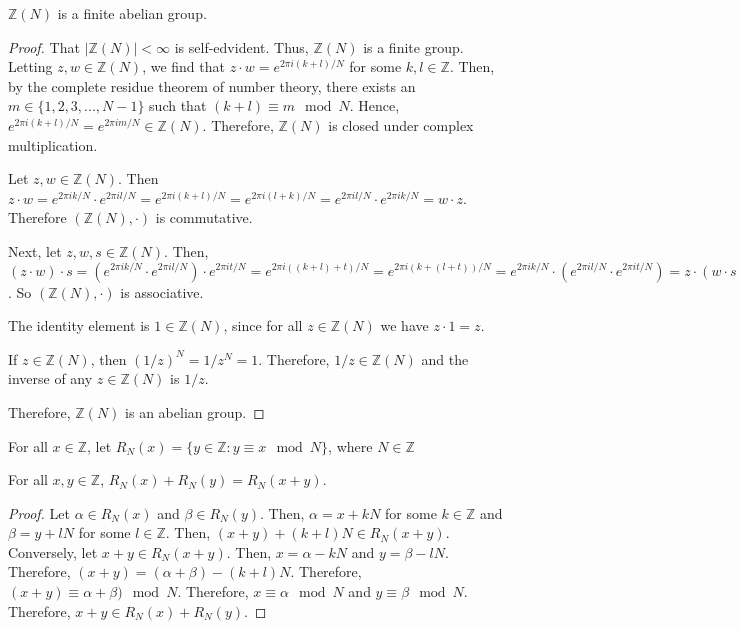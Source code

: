 \documentclass[../article.tex]{subfiles}
\begin{document}
\begin{theorem}
$\mathbb{Z}(N)$ is a finite abelian group.
\end{theorem}

\begin{proof}
That $| \mathbb{Z}(N)| < \infty$ is self-edvident. Thus, $\mathbb{Z}(N)$ is a finite group. Letting $z,w \in \mathbb{Z}(N)$, we find that $z \cdot w = e^{2 \pi i (k+l)/N}$ for some $k,l \in \mathbb{Z}$. Then, by the complete residue theorem of number theory, there exists an $m \in \{1, 2, 3, ..., N-1\}$ such that $(k+l) \equiv m \mod N$. Hence, $e^{2 \pi i (k+l)/N} = e^{2 \pi i m/N} \in \mathbb{Z}(N)$. Therefore, $\mathbb{Z}(N)$ is closed under complex multiplication.

Let $z,w \in \mathbb{Z}(N)$. Then $z \cdot w = e^{2 \pi i k/N} \cdot e^{2 \pi i l/N} = e^{2 \pi i (k+l)/N} = e^{2 \pi i (l+k)/N} = e^{2 \pi i l/N} \cdot e^{2 \pi i k/N} = w \cdot z$. Therefore $(\mathbb{Z}(N), \cdot)$ is commutative.

Next, let $z,w,s \in \mathbb{Z}(N)$. Then, $(z \cdot w) \cdot s = (e^{2 \pi i k/N} \cdot e^{2 \pi i l/N}) \cdot e^{2 \pi i t/N} = e^{2 \pi i ((k+l)+t)/N} = e^{2 \pi i (k+(l+t))/N} = e^{2 \pi i k/N} \cdot (e^{2 \pi i l/N} \cdot e^{2 \pi i t/N}) = z \cdot (w \cdot s)$. So $(\mathbb{Z}(N), \cdot)$ is associative.

The identity element is $1 \in \mathbb{Z}(N)$, since for all $z \in \mathbb{Z}(N)$ we have $z \cdot 1 = z$.

If $z \in \mathbb{Z}(N)$, then $(1/z)^N = 1/ z^N = 1$. Therefore, $1/z \in \mathbb{Z}(N)$ and the inverse of any $z \in \mathbb{Z}(N)$ is $1/z$.

Therefore, $\mathbb{Z}(N)$ is an abelian group.
\end{proof}

\begin{definition}
For all $x \in \mathbb{Z}$, let $R_N (x) = \{y \in \mathbb{Z} : y \equiv x   \mod   N\}$, where $N \in \mathbb{Z}$
\end{definition}
\begin{theorem}
For all $x,y \in \mathbb{Z}$, $R_N (x) + R_N (y) = R_N (x+y).$
\end{theorem}
\begin{proof}
Let $\alpha \in R_N (x)$ and $\beta \in R_N (y)$. Then, $\alpha = x +kN$ for some $k \in \mathbb{Z}$ and $\beta = y + lN$ for some $l \in \mathbb{Z}$. Then, $(x+y)+(k+l)N \in R_N (x+y)$. Conversely, let $x+y \in R_N (x+y)$. Then, $x = \alpha -kN$ and $y = \beta -lN$. Therefore, $(x+y) = (\alpha + \beta) -(k+l)N$. Therefore, $(x+y) \equiv \alpha +\beta) \mod N$. Therefore, $x \equiv \alpha \mod N$ and $y \equiv \beta \mod N$. Therefore, $x+y \in R_N (x) + R_N (y)$.
\end{proof}
\end{document}
